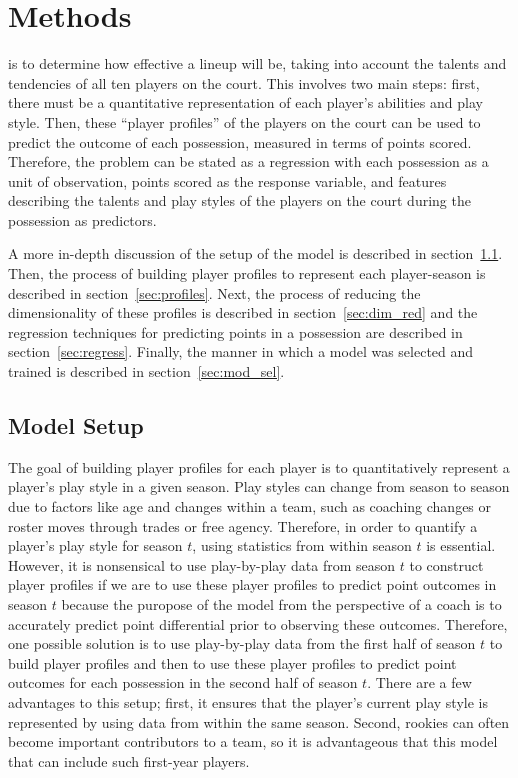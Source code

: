
\chapter{Methods}
\label{ch:methods}

 is to determine how
effective a lineup will be, taking into account the talents and tendencies of all
ten players on the court. This involves two main steps: first, there must be a
quantitative representation of each player's abilities and play style. Then, these
``player profiles'' of the players on the court can be used to predict the outcome
of each possession, measured in terms of points scored. Therefore, the problem can
be stated as a regression with each possession as a unit of observation, points
scored as the response variable, and features describing the talents and play
styles of the players on the court during the possession as predictors.

A more in-depth discussion of the setup of the model is described in
section~\ref{sec:setup}. Then, the process of building player profiles to represent
each player-season is described in section~\ref{sec:profiles}. Next, the process of
reducing the dimensionality of these profiles is described in
section~\ref{sec:dim_red} and the regression techniques for predicting points in a
possession are described in section~\ref{sec:regress}. Finally, the manner in which
a model was selected and trained is described in section~\ref{sec:mod_sel}.

\section{Model Setup}
\label{sec:setup}

The goal of building player profiles for each player is to quantitatively represent
a player's play style in a given season. Play styles can change from season to
season due to factors like age and changes within a team, such as coaching changes
or roster moves through trades or free agency. Therefore, in order to quantify a
player's play style for season $t$, using statistics from within season $t$ is
essential. However, it is nonsensical to use play-by-play data from season $t$ to
construct player profiles if we are to use these player profiles to predict point
outcomes in season $t$ because the puropose of the model from the perspective of a
coach is to accurately predict point differential prior to observing these outcomes.
Therefore, one possible solution is to use play-by-play data from the first half of
season $t$ to build player profiles and then to use these player profiles to predict
point outcomes for each possession in the second half of season $t$. There are a few
advantages to this setup; first, it ensures that the player's current play style is
represented by using data from within the same season. Second, rookies can often
become important contributors to a team, so it is advantageous that this model that
can include such first-year players.

